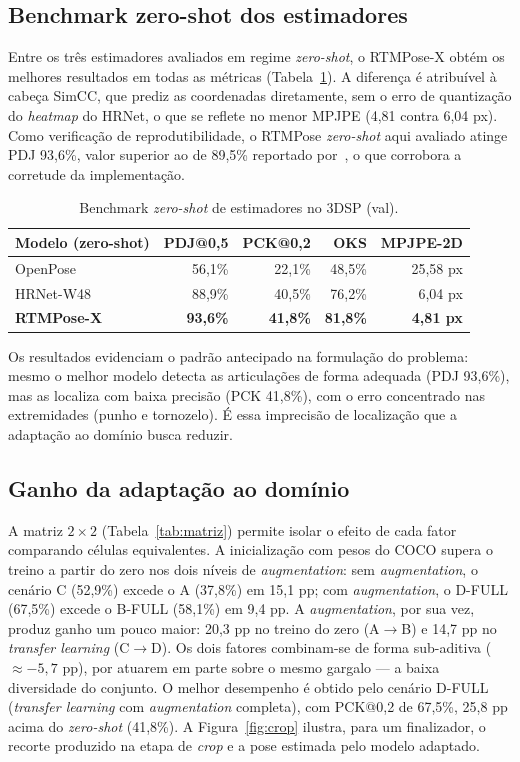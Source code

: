 \documentclass[12pt]{article}
\begin{document}
\subsection{Benchmark zero-shot dos estimadores}
\label{sec:estimador}

Entre os três estimadores avaliados em regime \emph{zero-shot}, o RTMPose-X obtém os melhores resultados em todas as métricas (Tabela~\ref{tab:zeroshot}). A diferença é atribuível à cabeça SimCC, que prediz as coordenadas diretamente, sem o erro de quantização do \emph{heatmap} do HRNet, o que se reflete no menor MPJPE (4,81 contra 6,04 px). Como verificação de reprodutibilidade, o RTMPose \emph{zero-shot} aqui avaliado atinge PDJ 93,6\%, valor superior ao de 89,5\% reportado por~\cite{yeung2024}, o que corrobora a corretude da implementação.

\begin{table}[ht]
\centering
\caption{Benchmark \emph{zero-shot} de estimadores no 3DSP (val).}
\label{tab:zeroshot}
\begin{tabular}{lrrrr}
\toprule
Modelo (zero-shot) & PDJ@0,5 & PCK@0,2 & OKS & MPJPE-2D \\
\midrule
OpenPose & 56,1\% & 22,1\% & 48,5\% & 25,58 px \\
HRNet-W48 & 88,9\% & 40,5\% & 76,2\% & 6,04 px \\
\textbf{RTMPose-X} & \textbf{93,6\%} & \textbf{41,8\%} & \textbf{81,8\%} & \textbf{4,81 px} \\
\bottomrule
\end{tabular}
\end{table}

Os resultados evidenciam o padrão antecipado na formulação do problema: mesmo o melhor modelo detecta as articulações de forma adequada (PDJ 93,6\%), mas as localiza com baixa precisão (PCK 41,8\%), com o erro concentrado nas extremidades (punho e tornozelo). É essa imprecisão de localização que a adaptação ao domínio busca reduzir.

\subsection{Ganho da adaptação ao domínio}

A matriz $2\times2$ (Tabela~\ref{tab:matriz}) permite isolar o efeito de cada fator comparando células equivalentes. A inicialização com pesos do COCO supera o treino a partir do zero nos dois níveis de \emph{augmentation}: sem \emph{augmentation}, o cenário C (52,9\%) excede o A (37,8\%) em 15,1 pp; com \emph{augmentation}, o D-FULL (67,5\%) excede o B-FULL (58,1\%) em 9,4 pp. A \emph{augmentation}, por sua vez, produz ganho um pouco maior: 20,3 pp no treino do zero (A$\rightarrow$B) e 14,7 pp no \emph{transfer learning} (C$\rightarrow$D). Os dois fatores combinam-se de forma sub-aditiva ($\approx -5{,}7$ pp), por atuarem em parte sobre o mesmo gargalo --- a baixa diversidade do conjunto. O melhor desempenho é obtido pelo cenário D-FULL (\emph{transfer learning} com \emph{augmentation} completa), com PCK@0,2 de 67,5\%, 25,8 pp acima do \emph{zero-shot} (41,8\%). A Figura~\ref{fig:crop} ilustra, para um finalizador, o recorte produzido na etapa de \emph{crop} e a pose estimada pelo modelo adaptado.
\end{document}
